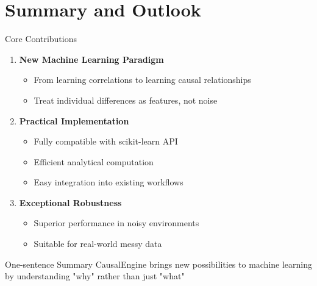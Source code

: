 \documentclass[aspectratio=169,10pt]{beamer}
\begin{document}
\section{Summary and Outlook}

\begin{frame}{Core Contributions}
\begin{enumerate}
    \item \textbf{New Machine Learning Paradigm}
    \begin{itemize}
        \item From learning correlations to learning causal relationships
        \item Treat individual differences as features, not noise
    \end{itemize}
    
    \item \textbf{Practical Implementation}
    \begin{itemize}
        \item Fully compatible with scikit-learn API
        \item Efficient analytical computation
        \item Easy integration into existing workflows
    \end{itemize}
    
    \item \textbf{Exceptional Robustness}
    \begin{itemize}
        \item Superior performance in noisy environments
        \item Suitable for real-world messy data
    \end{itemize}
\end{enumerate}

\vspace{1em}
\begin{block}{One-sentence Summary}
CausalEngine brings new possibilities to machine learning by understanding "why" rather than just "what"
\end{block}
\end{frame}
\end{document}

